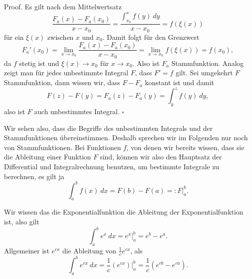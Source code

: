 \begin{emphBox}{}{}
Proof. Es gilt nach dem Mittelwertsatz
\begin{equation*}
 \frac{F_a(x)-F_a(x_0)}{x-x_0} = \frac{\int_{x_0}^x f(y)~dy }{x-x_0} = f(\xi(x))
\end{equation*}
für ein \(\xi(x)\) zwischen \(x\) und \(x_0\). Damit folgt für den Grenzwert
\begin{equation*}
 F_a'(x_0) = \lim_{x\rightarrow x_0}\frac{F_a(x)-F_a(x_0)}{x-x_0} =  \lim_{x\rightarrow x_0}f(\xi(x)) = f(x_0),
\end{equation*}
da \(f\) stetig ist und \(\xi(x) \rightarrow x_0\) für \(x \rightarrow x_0\). Also ist \(F_a\) Stammfunktion.
Analog zeigt man für jedes unbestimmte Integral \(F\), dass \(F'=f\) gilt.
Sei umgekehrt \(F\) Stammfunktion, dann wissen wir, dass \(F-F_a\) konstant ist und damit
\begin{equation*}
 F(z) - F(y) = F_a(z) - F_a(y) = \int_y^z f(y)~dy,
\end{equation*}
also ist \(F\) auch unbestimmtes Integral. \(\square\)
\end{emphBox}

Wir sehen also, dass die Begriffe des unbestimmten Integrals und der Stammfunktionen übereinstimmen. Deshalb sprechen wir im Folgenden nur noch von Stammfunktionen. Bei Funktionen \(f\), von denen wir bereits wissen, dass sie die Ableitung einer Funktion \(F\) sind, können wir also den Hauptsatz der Differential  und Integralrechnung benutzen, um bestimmte Integrale zu berechnen, es gilt ja
\begin{equation*}
 \int_a^b f(x)~dx = F(b) - F(a) =: F\vert_a^b.
\end{equation*}\label{integration/hdi:example-4}
\begin{example}{}{}



Wir wissen das die Exponentialfunktion die Ableitung der Exponentialfunktion ist, also gilt
\begin{equation*}
 \int_a^b e^x ~dx = e^x\vert_a^b = e^b -e^a.
\end{equation*}
Allgemeiner ist \(e^{cx}\) die Ableitung von \(\frac{1}c e^{cx}\), als
\begin{equation*}
 \int_a^b e^{cx} ~dx =\frac{1}c (e^{cx})\vert_a^b = \frac{1}c (e^{cb} -e^{ca}).
\end{equation*}\end{example}

